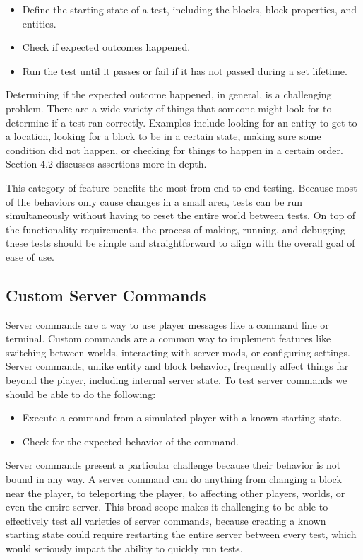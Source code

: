 \documentclass[12pt]{article}
\begin{document}
\begin{onehalfspacing}
\begin{itemize}
\item
  Define the starting state of a test, including the blocks, block
  properties, and entities.
\item
  Check if expected outcomes happened.
\item
  Run the test until it passes or fail if it has not passed during a set
  lifetime.
\end{itemize}

Determining if the expected outcome happened, in general, is a
challenging problem. There are a wide variety of things that someone
might look for to determine if a test ran correctly. Examples include
looking for an entity to get to a location, looking for a block to be in
a certain state, making sure some condition did not happen, or checking
for things to happen in a certain order. Section 4.2 discusses
assertions more in-depth.

This category of feature benefits the most from end-to-end testing.
Because most of the behaviors only cause changes in a small area, tests
can be run simultaneously without having to reset the entire world
between tests. On top of the functionality requirements, the process of
making, running, and debugging these tests should be simple and
straightforward to align with the overall goal of ease of use.

\subsection{Custom Server Commands}

Server commands are a way to use player messages like a command line or
terminal. Custom commands are a common way to implement features like
switching between worlds, interacting with server mods, or configuring
settings. Server commands, unlike entity and block behavior, frequently
affect things far beyond the player, including internal server state. To
test server commands we should be able to do the following:

\begin{itemize}
\item
  Execute a command from a simulated player with a known starting state.
\item
  Check for the expected behavior of the command.
\end{itemize}

Server commands present a particular challenge because their behavior is
not bound in any way. A server command can do anything from changing a
block near the player, to teleporting the player, to affecting other
players, worlds, or even the entire server. This broad scope makes it
challenging to be able to effectively test all varieties of server
commands, because creating a known starting state could require
restarting the entire server between every test, which would seriously
impact the ability to quickly run tests.


\end{onehalfspacing}
\end{document}

